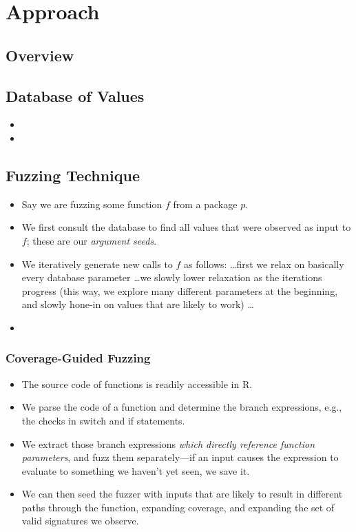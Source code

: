 \section{Approach}

\subsection{Overview}

\subsection{Database of Values}

\begin{itemize}
    \item {}
    \item {}
\end{itemize}

\subsection{Fuzzing Technique}

\begin{itemize}
    \item Say we are fuzzing some function $f$ from a package $p$.
    \item We first consult the database to find all values that were observed as input to $f$; these are our \textit{argument seeds}.
    \item We iteratively generate new calls to $f$ as follows: \ldots first we relax on basically every database parameter \ldots we slowly lower relaxation as the iterations progress (this way, we explore many different parameters at the beginning, and slowly hone-in on values that are likely to work) \ldots
    \item {}
\end{itemize}

\subsubsection{Coverage-Guided Fuzzing}

\begin{itemize}
    \item The source code of functions is readily accessible in R.
    \item We parse the code of a function and determine the branch expressions, e.g., the checks in switch and if statements.
    \item We extract those branch expressions \textit{which directly reference function parameters}, and fuzz them separately---if an input causes the expression to evaluate to something we haven't yet seen, we save it.
    \item We can then seed the fuzzer with inputs that are likely to result in different paths through the function, expanding coverage, and expanding the set of valid signatures we observe.
\end{itemize}

